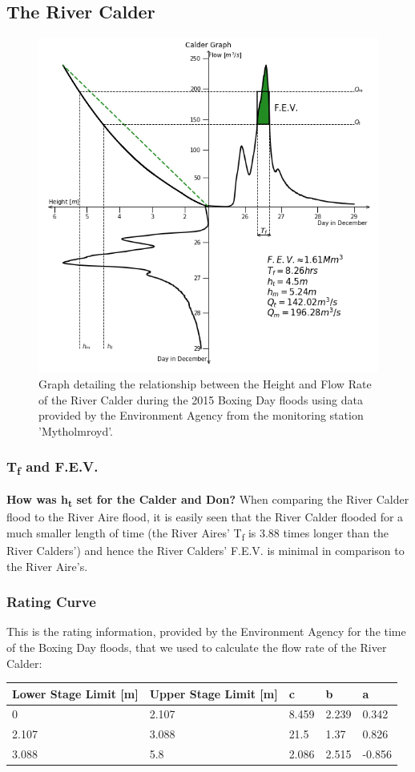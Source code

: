 \documentclass[11 pt, a4paper]{article}
\begin{document}
\subsection{The River Calder}
\begin{figure}[H]
\begin{center}
\includegraphics[width=.5\linewidth]{Calder-Quadrant_Graph.png}
\caption{Graph detailing the relationship between the Height and Flow Rate of the River Calder during the 2015 Boxing Day floods using data provided by the Environment Agency from the monitoring station 'Mytholmroyd'.}
\end{center}
\end{figure}
\subsubsection{T\textsubscript{f} and F.E.V.}
{\bf How was h\textsubscript{t} set for the Calder and Don?}
When comparing the River Calder flood to the River Aire flood, it is easily seen that the River Calder flooded for a much smaller length of time (the River Aires' T\textsubscript{f} is 3.88 times longer than the River Calders') and hence the River Calders' F.E.V. is minimal in comparison to the River Aire's.
\subsubsection{Rating Curve}
This is the rating information, provided by the Environment Agency for the time of the Boxing Day floods, that we used to calculate the flow rate of the River Calder:
\begin{center}
\begin{tabular}{|l|l|l|l|l|}
\hline
Lower Stage Limit {[}m{]} & Upper Stage Limit {[}m{]} & c & b & a \\
\hline
0 & 2.107 & 8.459 & 2.239 & 0.342 \\
2.107 & 3.088 & 21.5 & 1.37 & 0.826 \\
3.088 & 5.8 & 2.086 & 2.515 & -0.856 \\
\hline
\end{tabular}
\end{center}
\end{document}
